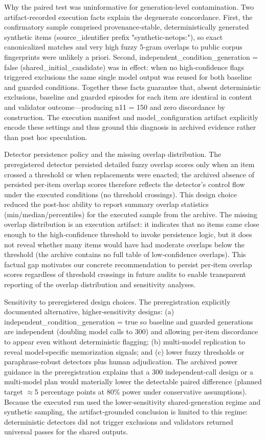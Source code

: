 \documentclass[conference]{IEEEtran}
\begin{document}
Why the paired test was uninformative for generation‑level contamination. Two artifact‑recorded execution facts explain the degenerate concordance. First, the confirmatory sample comprised provenance‑stable, deterministically generated synthetic items (source\_identifier prefix "synthetic-netops:"), so exact canonicalized matches and very high fuzzy 5‑gram overlaps to public corpus fingerprints were unlikely a priori. Second, independent\_condition\_generation = false (shared\_initial\_candidate) was in effect: when no high‑confidence flags triggered exclusions the same single model output was reused for both baseline and guarded conditions. Together these facts guarantee that, absent deterministic exclusions, baseline and guarded episodes for each item are identical in content and validator outcome---producing n11 = 150 and zero discordance by construction. The execution manifest and model\_configuration artifact explicitly encode these settings and thus ground this diagnosis in archived evidence rather than post hoc speculation.

Detector persistence policy and the missing overlap distribution. The preregistered detector persisted detailed fuzzy overlap scores only when an item crossed a threshold or when replacements were enacted; the archived absence of persisted per‑item overlap scores therefore reflects the detector's control flow under the executed conditions (no threshold crossings). This design choice reduced the post‑hoc ability to report summary overlap statistics (min/median/percentiles) for the executed sample from the archive. The missing overlap distribution is an execution artifact: it indicates that no items came close enough to the high‑confidence threshold to invoke persistence logic, but it does not reveal whether many items would have had moderate overlaps below the threshold (the archive contains no full table of low‑confidence overlaps). This factual gap motivates our concrete recommendation to persist per‑item overlap scores regardless of threshold crossings in future audits to enable transparent reporting of the overlap distribution and sensitivity analyses.

Sensitivity to preregistered design choices. The preregistration explicitly documented alternative, higher‑sensitivity designs: (a) independent\_condition\_generation = true so baseline and guarded generations are independent (doubling model calls to 300) and allowing per‑item discordance to appear even without deterministic flagging; (b) multi‑model replication to reveal model‑specific memorization signals; and (c) lower fuzzy thresholds or paraphrase‑robust detectors plus human adjudication. The archived power guidance in the preregistration explains that a 300 independent‑call design or a multi‑model plan would materially lower the detectable paired difference (planned target \ensuremath{\approx}5 percentage points at 80\% power under conservative assumptions). Because the executed run used the lower‑sensitivity shared‑generation regime and synthetic sampling, the artifact‑grounded conclusion is limited to this regime: deterministic detectors did not trigger exclusions and validators returned universal passes for the shared outputs.
\end{document}
